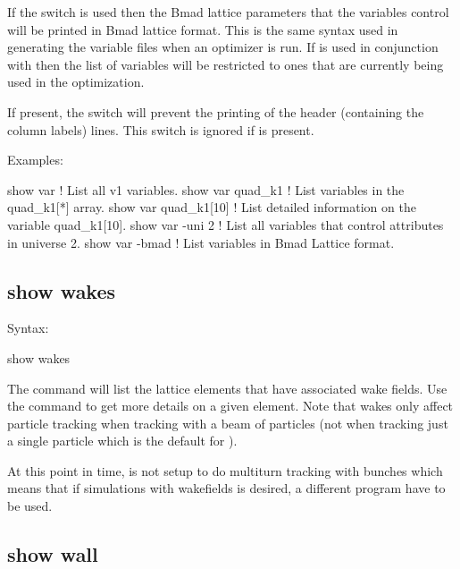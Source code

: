 {{{{{{If the  switch is used then the Bmad lattice parameters that the \tao
variables control will be printed in Bmad lattice format. This is the same syntax used in
generating the variable files when an optimizer is run. If  is used in
conjunction with  then the list of variables will be restricted to ones
that are currently being used in the optimization.

If present, the  switch will prevent the printing of the header
(containing the column labels) lines. This switch is ignored if  is present.

Examples:
\begin{example}
  show var             ! List all v1 variables.
  show var quad_k1     ! List variables in the quad_k1[*] array.
  show var quad_k1[10] ! List detailed information on the variable quad_k1[10].
  show var -uni 2      ! List all variables that control attributes in universe 2.
  show var -bmad       ! List variables in Bmad Lattice format.
\end{example}


\subsection{show wakes}
\label{s:show.wakes}

Syntax:
\begin{example}
  show wakes 
\end{example}

The  command will list the lattice elements that have associated wake
fields.  Use the  command to get more details on a given element. Note that
wakes only affect particle tracking when tracking with a beam of particles (not when
tracking just a single particle which is the default for \tao). 

At this point in time, \tao is not setup to do multiturn tracking with bunches which means
that if simulations with wakefields is desired, a different program have to be used.


\subsection{show wall}
\label{s:show.wall}

}}}}}}
